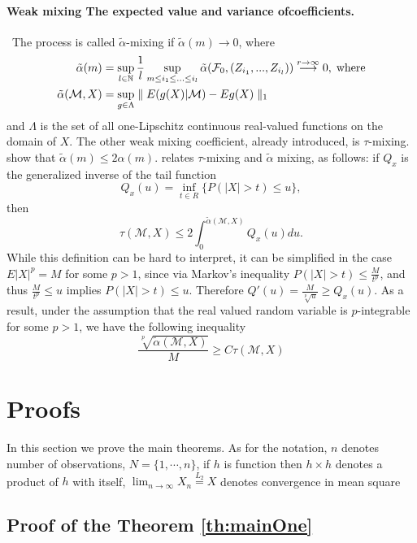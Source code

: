 \paragraph{Weak mixing The expected value and variance ofcoefficients.}\
The process is called $\tilde \alpha$-mixing if $\tilde \alpha(m) \rightarrow 0$, where 
\begin{align*}
\tilde \alpha(m)  &= \sup_{l \in \mathbb{N}} \frac 1 l \sup_{ m \leq i_1 \leq ... \leq i_l} \tilde \alpha( \mathcal F_0,(Z_{i_1},...,Z_{i_l}) )  \overset{r \to \infty}{\longrightarrow} 0,\;\text{where} \\
\tilde \alpha(\mathcal{M},X)  &=    \sup_{g \in \Lambda} \parallel  E(g(X)|\mathcal{M})  - E g(X) \parallel_{1} 
\end{align*}
and $\Lambda$ is the set of all one-Lipschitz continuous real-valued functions on the domain of $X$.
The other weak mixing coefficient, already introduced,  is $\tau$-mixing. \cite[Remark 2.4]{dedecker2007weak} show that $\tilde \alpha(m) \leq 2\alpha(m)$. \cite[Proposition 2]{dedecker2005new} relates $\tau$-mixing and $\tilde \alpha$ mixing, as follows: if $Q_x$ is the generalized inverse of the tail function
\[
 Q_x(u) = \inf_{t \in R} \{  P(|X| > t) \leq u\},  
\]
then
\[
 \tau(\mathcal{M},X) \leq 2 \int_{0}^{\tilde \alpha(\mathcal{M},X)}  Q_x(u) du.
\]
While this definition can be hard to interpret, it can be simplified in the case $E|X|^p=M$  for some $p>1$, since via Markov's inequality $P(|X|>t) \leq \frac{M}{t^p}$, and thus $\frac{M}{t^p} \leq u $ implies $P(|X|>t) \leq u$. Therefore $Q'(u) = \frac{M}{\sqrt[p]{u}} \geq Q_x(u)$. As a result, under the assumption that the real valued random variable is $p$-integrable for some $p>1$, we have the following inequality 
\[
 \frac{ \sqrt[p]{\tilde   \alpha(\mathcal{M},X)}}{M}  \geq C  \tau(\mathcal{M},X) 
\]

\section{Proofs}
\label{sec:Wildproofs}
In this section we prove the main theorems. As for the notation,  $n$ denotes number of observations, $N = \{1,\cdots, n\}$, if $h$ is  function then $h \times h$ denotes  a  product of $h$ with itself, $\lim_{n \to \infty} X_n \overset{L_2}{=} X$ denotes convergence in mean square 

\subsection{Proof of the Theorem   \ref{th:mainOne}} 
\label{sec:prMainOne}

